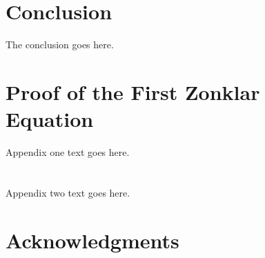 \documentclass[12pt,journal,compsoc]{IEEEtran}
\begin{document}
		
\section{Conclusion}
The conclusion goes here.






%


\appendices
\section{Proof of the First Zonklar Equation}
Appendix one text goes here.

\section{}
Appendix two text goes here.


\ifCLASSOPTIONcompsoc
  \section*{Acknowledgments}
\else
\end{document}
